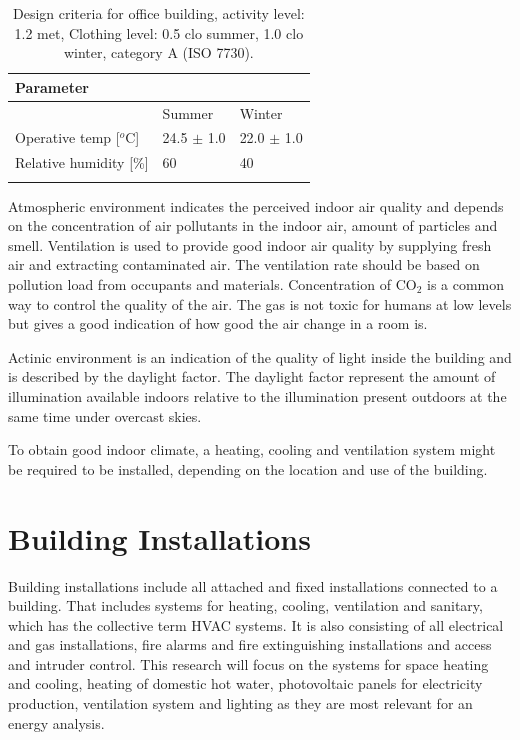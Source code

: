 \begin{table}[h!]
    \centering
        \caption{Design criteria for office building, activity level: 1.2 met, Clothing level: 0.5 clo summer, 1.0 clo winter, category A (ISO 7730).}
    \begin{tabular}{p{3.5cm}|p{1.8cm}|p{1.8cm}}
    \rowcolor{denim} \color{white} Parameter & & \\
    \hline
       \rowcolor{lblue} & Summer & Winter  \\
         \hline
         \rowcolor{denim} Operative temp [$^o$C] & 24.5 $\pm$ 1.0 & 22.0 $\pm$ 1.0  \\
    \hline
       \rowcolor{lblue} Relative humidity [\%] & 60 & 40  \\
         \hline
         & &  \\
    \end{tabular}
    \label{tab:design}
\end{table}

Atmospheric environment indicates the perceived indoor air quality and depends on the concentration of air pollutants in the indoor air, amount of particles and smell. Ventilation is used to provide good indoor air quality by supplying fresh air and extracting contaminated air. The ventilation rate should be based on pollution load from occupants and materials. Concentration of CO$_2$ is a common way to control the quality of the air. The gas is not toxic for humans at low levels but gives a good indication of how good the air change in a room is. 

Actinic environment is an indication of the quality of light inside the building and is described by the daylight factor. The daylight factor represent the amount of illumination available indoors relative to the illumination present outdoors at the same time under overcast skies.

To obtain good indoor climate, a heating, cooling and ventilation system might be required to be installed, depending on the location and use of the building.



\section{Building Installations}
Building installations include all attached and fixed installations connected to a building. That includes systems for heating, cooling, ventilation and sanitary, which has the collective term HVAC systems. It is also consisting of all electrical and gas installations, fire alarms and fire extinguishing installations and access and intruder control. This research will focus on the systems for space heating and cooling, heating of domestic hot water, photovoltaic panels for electricity production, ventilation system and lighting as they are most relevant for an energy analysis.

